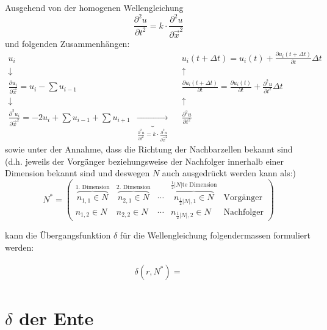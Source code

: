 \documentclass[11pt]{article} %
\theoremstyle{definition}
\begin{document}
Ausgehend von der homogenen Wellengleichung
\begin{equation*}
\frac{\partial^2 u}{\partial t^2} = k\cdot \frac{\partial^2 u}{\partial \vec{x}^2}
\end{equation*}
und folgenden Zusammenhängen:
\begin{align*}
u_i &&& u_i(t+\Delta t) = u_i(t) +  \frac{\partial u_i(t+\Delta t)}{\partial t}\Delta t \\
\downarrow &&& \uparrow \\
\frac{\partial u_i}{\partial \vec x} = u_i - \sum u_{i-1} &&& \frac{\partial u_i(t+\Delta t)}{\partial t} = \frac{\partial u_i(t)}{\partial t} + \frac{\partial^2 u}{\partial t^2}\Delta t \\
\downarrow &&& \uparrow \\
\frac{\partial^2 u_i}{\partial \vec x^2} = -2u_i + \sum u_{i-1} + \sum u_{i+1} & \underbrace{\longrightarrow}_{\frac{\partial^2 u}{\partial t^2} = k\cdot \frac{\partial^2 u}{\partial \vec{x}^2}} && \frac{\partial^2 u}{\partial t^2}
\end{align*}
sowie unter der Annahme, dass die Richtung der Nachbarzellen bekannt sind (d.h. jeweils der Vorgänger beziehungsweise der Nachfolger innerhalb einer Dimension bekannt sind und deswegen $N$ auch ausgedrückt werden kann als:)
\[
N^* =\begin{pmatrix} \overbrace{n_{1,1} \in N}^{\textrm{1. Dimension}} & \overbrace{n_{2,1} \in N}^{\textrm{2. Dimension}} & \cdots & \overbrace{n_{\frac{1}{2}|N|, 1} \in N}^{\textrm{$\frac{1}{2}|N|$te Dimension}} & \textrm{Vorgänger} \\
n_{1,2} \in N & n_{2,2} \in N & \cdots & n_{\frac{1}{2}|N|, 2} \in N & \textrm{Nachfolger}
 \end{pmatrix}
\]

kann die Übergangsfunktion $\delta$ für die Wellengleichung folgendermassen formuliert werden:

\begin{eqnarray*}
\delta(r, N^*) = 
\end{eqnarray*}

\section{$\delta$ der Ente}
\end{document}
